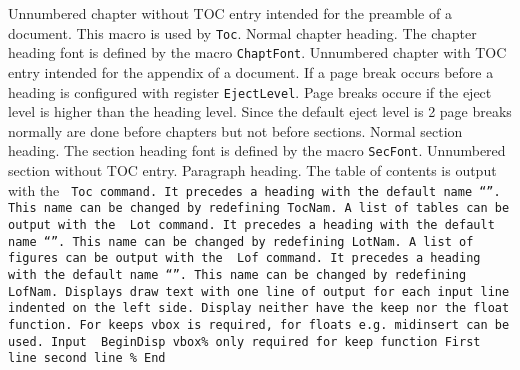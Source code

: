 \endinsert
{}%
%
\BeginDesc
{}
%
Unnumbered chapter without TOC entry intended for the preamble of a document.
This macro is used by {\tt\RS Toc}.
%
Normal chapter heading.
The chapter heading font is defined by the macro
{\tt\RS ChaptFont}.
%
Unnumbered chapter with TOC entry intended for the appendix of a document.
\End
If a page break occurs before a heading is configured with register
{\tt\RS EjectLevel}.
Page breaks occure if the eject level is higher than the heading level.
Since the default eject level is 2 page breaks normally are done before
chapters but not before sections.
%
\BeginDesc
{}
%
Normal section heading.
The section heading font is defined by the macro
{\tt\RS SecFont}.
%
Unnumbered section without TOC entry.
\End
{}%
\BeginDesc
{}
%
Paragraph heading.
\End
{}%
The table of contents is output with the
\BeginDisp\tt
\RS Toc
\End
command.
It precedes a heading with the default name ``\TocNam''.
This name can be changed by redefining {\tt\RS TocNam}.
%
A list of tables can be output with the
\BeginDisp\tt
\RS Lot
\End
command.
It precedes a heading with the default name ``\LotNam''.
This name can be changed by redefining {\tt\RS LotNam}.
%
A list of figures can be output with the
\BeginDisp\tt
\RS Lof
\End
command.
It precedes a heading with the default name ``\LofNam''.
This name can be changed by redefining {\tt\RS LofNam}.
%
Displays draw text with one line of output for each input line
indented on the left side.
Display neither have the keep nor the float
function.
For keeps {\tt\RS vbox} is required, for floats e.g.
{\tt\RS midinsert} can be used.
Input
\BeginDisp\tt
\vbox{%
\RS BeginDisp
\RS vbox\lC\% only required for keep function
First line
second line
\rC\%
\RS End
}%
